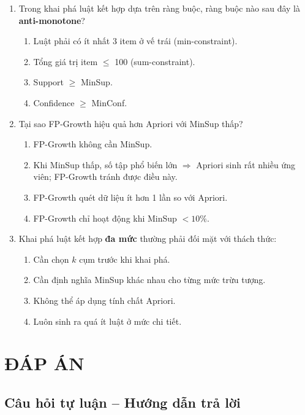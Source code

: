 \documentclass[10pt]{article}
\begin{document}
\begin{enumerate}[leftmargin=*, label=\textbf{Câu \arabic*.}]
    \item Trong khai phá luật kết hợp dựa trên ràng buộc, ràng buộc nào sau đây là \textbf{anti-monotone}?
    \begin{enumerate}[label=\Alph*.]
        \item Luật phải có ít nhất 3 item ở vế trái (min-constraint).
        \item Tổng giá trị item $\leq$ 100 (sum-constraint).
        \item Support $\geq$ MinSup.
        \item Confidence $\geq$ MinConf.
    \end{enumerate}

    \item Tại sao FP-Growth hiệu quả hơn Apriori với MinSup thấp?
    \begin{enumerate}[label=\Alph*.]
        \item FP-Growth không cần MinSup.
        \item Khi MinSup thấp, số tập phổ biến lớn $\Rightarrow$ Apriori sinh rất nhiều ứng viên; FP-Growth tránh được điều này.
        \item FP-Growth quét dữ liệu ít hơn 1 lần so với Apriori.
        \item FP-Growth chỉ hoạt động khi MinSup $< 10\%$.
    \end{enumerate}

    \item Khai phá luật kết hợp \textbf{đa mức} thường phải đối mặt với thách thức:
    \begin{enumerate}[label=\Alph*.]
        \item Cần chọn $k$ cụm trước khi khai phá.
        \item Cần định nghĩa MinSup khác nhau cho từng mức trừu tượng.
        \item Không thể áp dụng tính chất Apriori.
        \item Luôn sinh ra quá ít luật ở mức chi tiết.
    \end{enumerate}

\end{enumerate}

\newpage
\section*{ĐÁP ÁN}

\subsection*{Câu hỏi tự luận -- Hướng dẫn trả lời}
\end{document}
